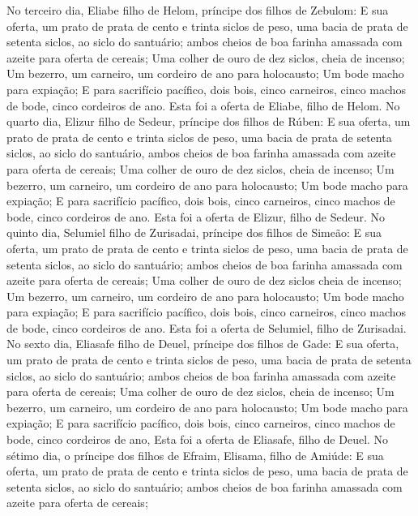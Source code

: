 {  No terceiro dia, Eliabe filho de Helom, príncipe dos filhos de Zebulom:
  E sua oferta, um prato de prata de cento e trinta siclos de peso, uma bacia de prata de setenta siclos, ao siclo do santuário; ambos cheios de boa farinha amassada com azeite para oferta de cereais;
  Uma colher de ouro de dez siclos, cheia de incenso;
  Um bezerro, um carneiro, um cordeiro de ano para holocausto;
  Um bode macho para expiação;
  E para sacrifício pacífico, dois bois, cinco carneiros, cinco machos de bode, cinco cordeiros de ano. Esta foi a oferta de Eliabe, filho de Helom.
  No quarto dia, Elizur filho de Sedeur, príncipe dos filhos de Rúben:
  E sua oferta, um prato de prata de cento e trinta siclos de peso, uma bacia de prata de setenta siclos, ao siclo do santuário, ambos cheios de boa farinha amassada com azeite para oferta de cereais;
  Uma colher de ouro de dez siclos, cheia de incenso;
  Um bezerro, um carneiro, um cordeiro de ano para holocausto;
  Um bode macho para expiação;
  E para sacrifício pacífico, dois bois, cinco carneiros, cinco machos de bode, cinco cordeiros de ano. Esta foi a oferta de Elizur, filho de Sedeur.
  No quinto dia, Selumiel filho de Zurisadai, príncipe dos filhos de Simeão:
  E sua oferta, um prato de prata de cento e trinta siclos de peso, uma bacia de prata de setenta siclos, ao siclo do santuário; ambos cheios de boa farinha amassada com azeite para oferta de cereais;
  Uma colher de ouro de dez siclos cheia de incenso;
  Um bezerro, um carneiro, um cordeiro de ano para holocausto;
  Um bode macho para expiação;
  E para sacrifício pacífico, dois bois, cinco carneiros, cinco machos de bode, cinco cordeiros de ano. Esta foi a oferta de Selumiel, filho de Zurisadai.
  No sexto dia, Eliasafe filho de Deuel, príncipe dos filhos de Gade:
  E sua oferta, um prato de prata de cento e trinta siclos de peso, uma bacia de prata de setenta siclos, ao siclo do santuário; ambos cheios de boa farinha amassada com azeite para oferta de cereais;
  Uma colher de ouro de dez siclos, cheia de incenso;
  Um bezerro, um carneiro, um cordeiro de ano para holocausto;
  Um bode macho para expiação;
  E para sacrifício pacífico, dois bois, cinco carneiros, cinco machos de bode, cinco cordeiros de ano, Esta foi a oferta de Eliasafe, filho de Deuel.
  No sétimo dia, o príncipe dos filhos de Efraim, Elisama, filho de Amiúde: %
  E sua oferta, um prato de prata de cento e trinta siclos de peso, uma bacia de prata de setenta siclos, ao siclo do santuário; ambos cheios de boa farinha amassada com azeite para oferta de cereais;
}
